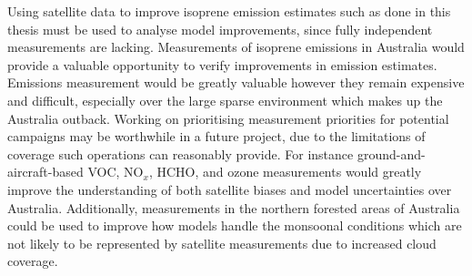   Using satellite data to improve isoprene emission estimates such as done in this thesis must be used to analyse model improvements, since fully independent measurements are lacking.
  Measurements of isoprene emissions in Australia would provide a valuable opportunity to verify improvements in emission estimates.
  Emissions measurement would be greatly valuable however they remain expensive and difficult, especially over the large sparse environment which makes up the Australia outback.
  Working on prioritising measurement priorities for potential campaigns may be worthwhile in a future project, due to the limitations of coverage such operations can reasonably provide.
  For instance ground-and-aircraft-based VOC, NO$_x$, HCHO, and ozone measurements would greatly improve the understanding of both satellite biases and model uncertainties over Australia.
  Additionally, measurements in the northern forested areas of Australia could be used to improve how models handle the monsoonal conditions which are not likely to be represented by satellite measurements due to increased cloud coverage.


